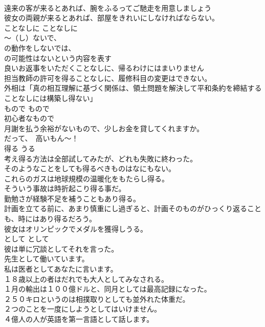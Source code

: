 \documentclass[8pt]{extreport}
\begin{document}
\begin{CJK}{UTF8}{min}
\\	遠来の客が来るとあれば、腕をふるってご馳走を用意しましょう  
\\	彼女の両親が来るとあれば、部屋をきれいにしなければならない。  
\\	ことなしに	ことなしに	
\\	〜（し）ないで、
\\	の動作をしないでは、
\\	の可能性はないという内容を表す
\\	良いお返事をいただくことなしに、帰るわけにはまいりません  
\\	担当教師の許可を得ることなしに、履修科目の変更はできない。  
\\	外相は「真の相互理解に基づく関係は、領土問題を解決して平和条約を締結することなしには構築し得ない」  
\\	もので	もので	
\\	初心者なもので  
\\	月謝を払う余裕がないもので、少しお金を貸してくれますか。  
\\	だって、　高いもん〜！  
\\	得る	うる	
\\	考え得る方法は全部試してみたが、どれも失敗に終わった。  
\\	そのようなことをしても得るべきものはなにもない。  
\\	これらのガスは地球規模の温暖化をもたらし得る。  
\\	そういう事故は時折起こり得る事だ。  
\\	勤勉さが経験不足を補うこともあり得る。  
\\	計画を立てる前に、あまり慎重にし過ぎると、計画そのものがひっくり返ることも、時にはあり得るだろう。  
\\	彼女はオリンピックでメダルを獲得しうる。  
\\	として	として	
\\	彼は単に冗談としてそれを言った。  
\\	先生として働いています。  
\\	私は医者としてあなたに言います。   
\\	１８歳以上の者はだれでも大人としてみなされる。   
\\	１月の輸出は１００億ドルと、同月としては最高記録になった。   
\\	２５０キロというのは相撲取りとしても並外れた体重だ。   
\\	２つのことを一度にしようとしてはいけません。  
\\	４億人の人が英語を第一言語として話します。   

\end{CJK}
\end{document}
